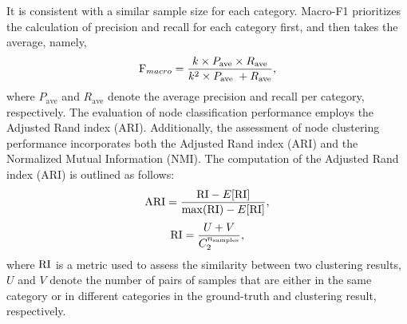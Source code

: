 It is consistent with a similar sample size for each category.  
%
Macro-F1 prioritizes the calculation of precision and recall for each category first, and then takes the average, namely, 
\begin{equation}\label{eq:macro}
    \textnormal{F}_{macro} =\frac{k \times P_{\text {ave}} \times R_{\text {ave}}}{k^2 \times P_{\text {ave }}+R_{\text {ave}}},
\end{equation}
where $P_{\text{ave}}$ and $ R_{\text{ave}} $ denote the average precision and recall per category, respectively.
The evaluation of node classification performance employs the Adjusted Rand index (ARI). 
Additionally, the assessment of node clustering performance incorporates both the Adjusted Rand index (ARI) and the Normalized Mutual Information (NMI). 
The computation of the Adjusted Rand index (ARI) is outlined as follows:
\begin{equation}
\textnormal{ARI}=\frac{\textnormal{RI}-E[\textnormal{RI}]}{\max (\textnormal{RI})-E[\textnormal{RI}]},
\end{equation}
\begin{equation}
    \textnormal{RI} =\frac{U + V}{C_2^{n_{\text {samples}}}},
\end{equation}
where $\textnormal{RI}$ is a metric used to assess the similarity between two clustering results, $U$ and $V$ denote the number of pairs of samples that are either in the same category or in different categories in the ground-truth and clustering result, respectively.
% 

